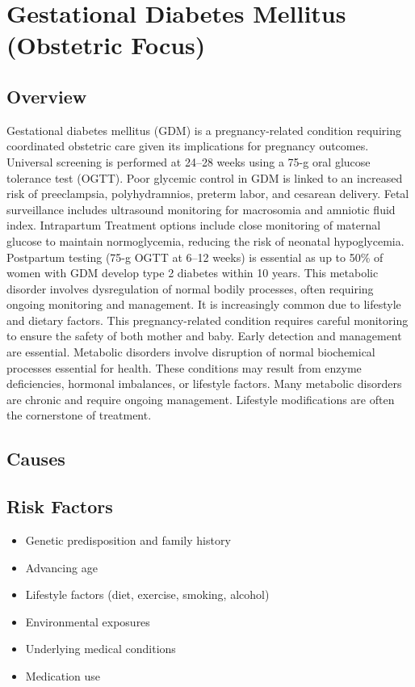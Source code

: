 \chapter{Gestational Diabetes Mellitus (Obstetric Focus)}
\label{sec:obstetric:Gestational Diabetes Mellitus}

\section{Overview}
Gestational diabetes mellitus (GDM) is a pregnancy-related condition requiring coordinated obstetric care given its implications for pregnancy outcomes. Universal screening is performed at 24--28 weeks using a 75-g oral glucose tolerance test (OGTT). Poor glycemic control in GDM is linked to an increased risk of preeclampsia, polyhydramnios, preterm labor, and cesarean delivery. Fetal surveillance includes ultrasound monitoring for macrosomia and amniotic fluid index. Intrapartum Treatment options include close monitoring of maternal glucose to maintain normoglycemia, reducing the risk of neonatal hypoglycemia. Postpartum testing (75-g OGTT at 6--12 weeks) is essential as up to 50\% of women with GDM develop type 2 diabetes within 10 years. This metabolic disorder involves dysregulation of normal bodily processes, often requiring ongoing monitoring and management. It is increasingly common due to lifestyle and dietary factors. This pregnancy-related condition requires careful monitoring to ensure the safety of both mother and baby. Early detection and management are essential. Metabolic disorders involve disruption of normal biochemical processes essential for health. These conditions may result from enzyme deficiencies, hormonal imbalances, or lifestyle factors. Many metabolic disorders are chronic and require ongoing management. Lifestyle modifications are often the cornerstone of treatment.
\section{Causes}
\section{Risk Factors}
\begin{itemize}[noitemsep]
  \item Genetic predisposition and family history
  \item Advancing age
  \item Lifestyle factors (diet, exercise, smoking, alcohol)
  \item Environmental exposures
  \item Underlying medical conditions
  \item Medication use
\end{itemize}
